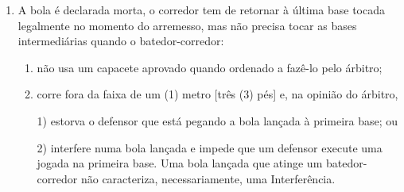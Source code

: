 \begin{enumerate}[label=(\alph*)]
	\item  A bola é declarada morta, o corredor tem de retornar à última base tocada legalmente no momento do arremesso, mas não precisa tocar as bases intermediárias quando o batedor-corredor:
	\begin{enumerate}[label=\roman*.]
		\item  não usa um capacete aprovado quando ordenado a fazê-lo pelo árbitro;
		\item  corre fora da faixa de um (1) metro [três (3) pés] e, na opinião do árbitro,

		1) estorva o defensor que está pegando a bola lançada à primeira base;
		ou

		2) interfere numa bola lançada e impede que um defensor execute uma  jogada na primeira base. Uma bola lançada que atinge um batedor- corredor não caracteriza, necessariamente, uma Interferência.


\end{enumerate}
\end{enumerate}
